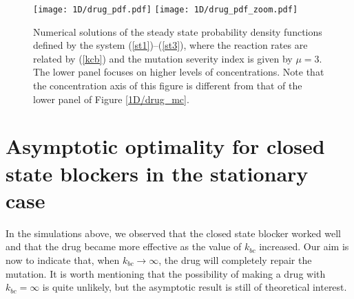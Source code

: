 \begin{figure}[p]\centering
\vbox{
\texttt{[image: 1D/drug\_pdf.pdf]}
\texttt{[image: 1D/drug\_pdf\_zoom.pdf]}
}
\caption{Numerical solutions of the steady state probability density functions defined by the system (\ref{st1})--(\ref{st3}), 
 where the reaction rates are related by (\ref{kcb}) and the mutation severity index is given by $\mu=3$. The lower panel focuses on higher levels of concentrations. Note that the concentration axis of this figure is different from that of the lower panel of Figure \ref{1D/drug_mc}. \label{1D/drug_pdf}}
\end{figure}

\section{Asymptotic optimality for closed state blockers in the stationary case}
\label{asymptotic}

In the simulations above, we observed that the closed state blocker worked well and that the drug became more effective as the value of $k_{bc}$ increased.  Our aim is now to indicate that, when $k_{bc}\rightarrow \infty$, the drug will completely repair the mutation. 
It is worth mentioning that the possibility of making a drug with $k_{bc}=\infty$ is quite unlikely, but the asymptotic result is still of theoretical interest.

